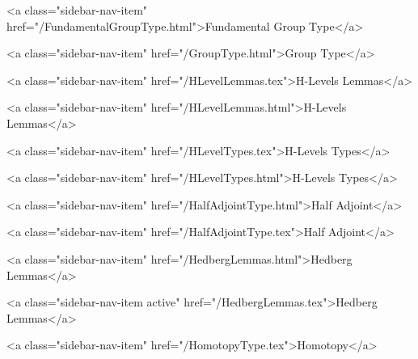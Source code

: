       
    
      
        
          <a class="sidebar-nav-item" href="/FundamentalGroupType.html">Fundamental Group Type</a>
        
      
    
      
        
          <a class="sidebar-nav-item" href="/GroupType.html">Group Type</a>
        
      
    
      
        
          <a class="sidebar-nav-item" href="/HLevelLemmas.tex">H-Levels Lemmas</a>
        
      
    
      
        
          <a class="sidebar-nav-item" href="/HLevelLemmas.html">H-Levels Lemmas</a>
        
      
    
      
        
          <a class="sidebar-nav-item" href="/HLevelTypes.tex">H-Levels Types</a>
        
      
    
      
        
          <a class="sidebar-nav-item" href="/HLevelTypes.html">H-Levels Types</a>
        
      
    
      
        
          <a class="sidebar-nav-item" href="/HalfAdjointType.html">Half Adjoint</a>
        
      
    
      
        
          <a class="sidebar-nav-item" href="/HalfAdjointType.tex">Half Adjoint</a>
        
      
    
      
        
          <a class="sidebar-nav-item" href="/HedbergLemmas.html">Hedberg Lemmas</a>
        
      
    
      
        
          <a class="sidebar-nav-item active" href="/HedbergLemmas.tex">Hedberg Lemmas</a>
        
      
    
      
        
          <a class="sidebar-nav-item" href="/HomotopyType.tex">Homotopy</a>
        
